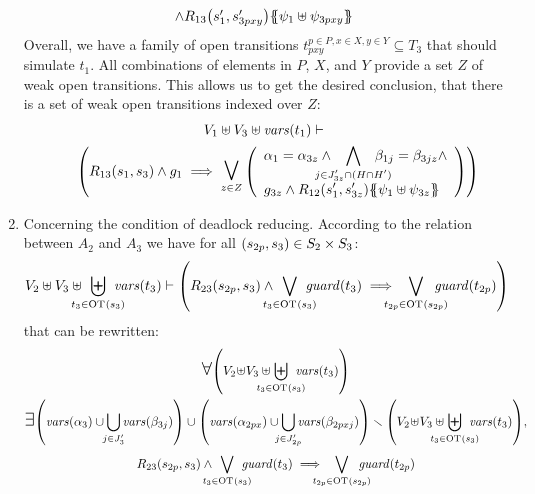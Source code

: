 \documentclass[runningheads]{llncs}
\begin{document}
\begin{enumerate}
\begin{multline*}
{\begin{array}{l}
{\wedge R_{13}{\left(s'_1,s'_{3pxy}\right)}}{\left\{\!\!{\left\{\psi_1  \uplus \psi_{3pxy}\right\}}\!\!\right\}}
\end{array}}
\end{multline*}
Overall, we have a family of open transitions $t^{p\in P,x\in X,y\in Y}_{pxy} \subseteq T_3$ that should simulate $t_1$. All  combinations of elements in $P$, $X$, and $Y$ provide a set $Z$ of weak open transitions.  This allows us to get the desired conclusion, that there is a set of weak open transitions indexed over $Z$:
\begin{multline*}
V_1 \uplus  V_3 \uplus \fvars{t_1}
\vdash\\\hspace{2em}
\mpar{R_{13}\mpar{s_1, s_3} \wedge g_1 \implies 
\operatorname*{\bigsymb{\bigvee}}_{z \in Z}
\mpar{\everymath{\displaystyle}
\begin{array}{l}
\alpha_1=\alpha_{3z}\wedge \bigwedge_\subbox{j \in J'_{3z} \cap (H\cap H')} \beta_{1j}=\beta_{3jz} \wedge \\g_{3z}\wedge 
{R_{12}\mpar{s'_1,s'_{3z}}}\psubst{\psi_1  \uplus \psi_{3z}}
\end{array}}}
\end{multline*}	
\medskip
\item Concerning the condition of deadlock reducing. According to the relation between   $A_2$ and $A_3$ we have for all ${\left(s_{2p}, s_3\right)} \in S_2 \times S_3$:
\begin{multline*}
 V_2 \uplus V_3 \uplus \biguplus_\subbox{t_3 \in \fOT{s_3}} \fvars{t_3} \vdash \left(R_{23}\mpar{s_{2p}, s_3} \wedge \bigvee_\subbox{t_3 \in \fOT{s_3}} \fguard{t_3} \implies \bigvee_\subbox{t_{2p} \in \fOT{s_{2p}}} \fguard{t_{2p}} \right)
\end{multline*}
that can be rewritten:
\begin{multline*}
\everymath{\displaystyle}
\bigforall \mpar{V_2\! \uplus\!V_3 \uplus\!\! \biguplus_\subbox{t_3 \in \fOT{s_3}} \fvars{t_3}}\\
\bigexists \mpar{\fvars{\alpha_{3}}  \cup \!\!\bigcup_{j \in J'_{3}} \!\!\fvars{\beta_{3j}}} \cup \mpar{\fvars{\alpha_{2px}}  \cup \!\!\! \bigcup_{j \in J'_{2p}} \!\!\!\fvars{\beta_{2pxj}}}
 \setminus \mpar{V_2\! \uplus\!V_3 \uplus\!\! \biguplus_\subbox{t_3 \in \fOT{s_3}} \fvars{t_3}},\\
R_{23}\mpar{s_{2p}, s_3} \wedge \bigvee_\subbox{t_3 \in \fOT{s_3}} \fguard{t_3} \implies \bigvee_\subbox{t_{2p} \in \fOT{s_{2p}}} \fguard{t_{2p}} 
\end{multline*}

\end{enumerate}
\end{document}
